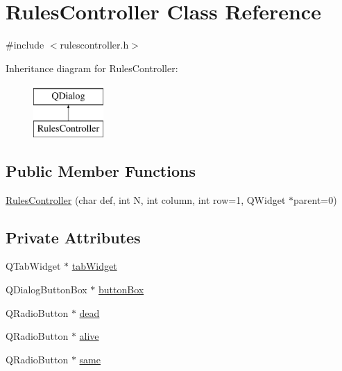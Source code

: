\hypertarget{class_rules_controller}{}\section{Rules\+Controller Class Reference}
\label{class_rules_controller}


{\ttfamily \#include $<$rulescontroller.\+h$>$}

Inheritance diagram for Rules\+Controller\+:\begin{figure}[H]
\begin{center}
\leavevmode
\includegraphics[height=2.000000cm]{class_rules_controller}
\end{center}
\end{figure}
\subsection*{Public Member Functions}
\begin{DoxyCompactItemize}
\item 
\mbox{\hyperlink{class_rules_controller_a91f872c80e266517c4fd12674b477996}{Rules\+Controller}} (char def, int N, int column, int row=1, Q\+Widget $\ast$parent=0)
\end{DoxyCompactItemize}
\subsection*{Private Attributes}
\begin{DoxyCompactItemize}
\item 
Q\+Tab\+Widget $\ast$ \mbox{\hyperlink{class_rules_controller_afcb40145540839909f809fe27d24156c}{tab\+Widget}}
\item 
Q\+Dialog\+Button\+Box $\ast$ \mbox{\hyperlink{class_rules_controller_a53f287abf68fb9891bdd7a6f21f31c22}{button\+Box}}
\item 
Q\+Radio\+Button $\ast$ \mbox{\hyperlink{class_rules_controller_a2f993272d5b1faac4f52116d6e66afbf}{dead}}
\item 
Q\+Radio\+Button $\ast$ \mbox{\hyperlink{class_rules_controller_a24a431e369285ef2cf12a95eeeb0c7e1}{alive}}
\item 
Q\+Radio\+Button $\ast$ \mbox{\hyperlink{class_rules_controller_afee85c960a94ec09c46e74036cfbb81b}{same}}
\end{DoxyCompactItemize}

